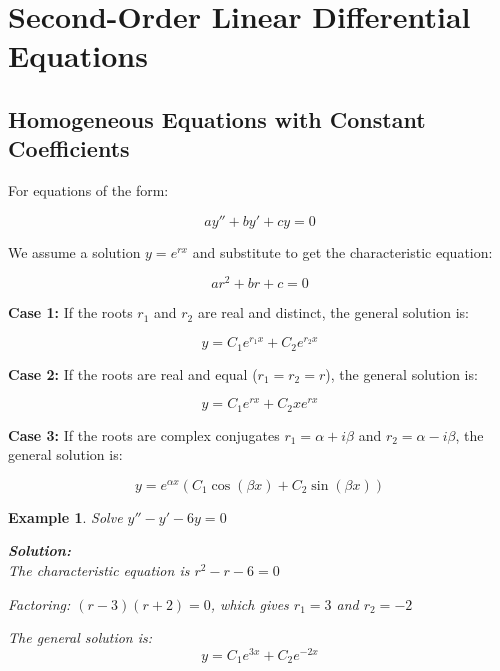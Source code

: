 \documentclass{article}
\newtheorem{example}{Example}
\begin{document}
\section{Second-Order Linear Differential Equations}

\subsection{Homogeneous Equations with Constant Coefficients}

For equations of the form:

\begin{equation}
ay'' + by' + cy = 0
\end{equation}

We assume a solution $y = e^{rx}$ and substitute to get the characteristic equation:

\begin{equation}
ar^2 + br + c = 0
\end{equation}

\textbf{Case 1:} If the roots $r_1$ and $r_2$ are real and distinct, the general solution is:

\begin{equation}
y = C_1e^{r_1x} + C_2e^{r_2x}
\end{equation}

\textbf{Case 2:} If the roots are real and equal ($r_1 = r_2 = r$), the general solution is:

\begin{equation}
y = C_1e^{rx} + C_2xe^{rx}
\end{equation}

\textbf{Case 3:} If the roots are complex conjugates $r_1 = \alpha + i\beta$ and $r_2 = \alpha - i\beta$, the general solution is:

\begin{equation}
y = e^{\alpha x}(C_1\cos(\beta x) + C_2\sin(\beta x))
\end{equation}

\begin{example}
Solve $y'' - y' - 6y = 0$

\textbf{Solution:}\\
The characteristic equation is $r^2 - r - 6 = 0$

Factoring: $(r-3)(r+2) = 0$, which gives $r_1 = 3$ and $r_2 = -2$

The general solution is:
\begin{equation}
y = C_1e^{3x} + C_2e^{-2x}
\end{equation}
\end{example}
\end{document}
